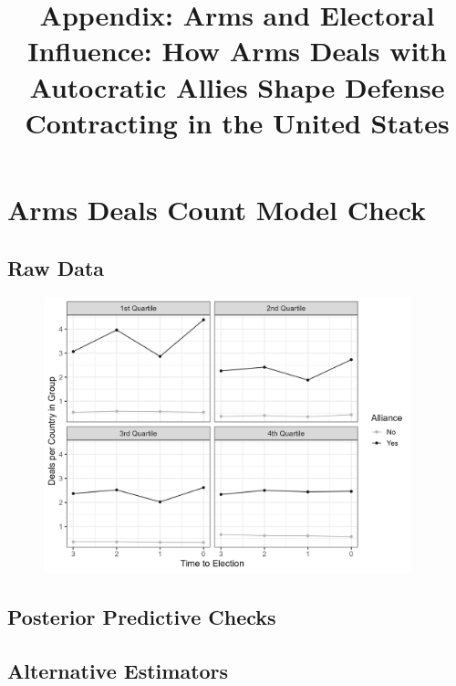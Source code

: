 \documentclass[12pt]{article}
\title{\textbf{Appendix: Arms and Electoral Influence: How Arms Deals with Autocratic Allies Shape Defense Contracting in the United States}}
\date{}
\begin{document}
\maketitle 

\singlespace 

\tableofcontents

\bigskip





\section{Arms Deals Count Model Check}

\subsection{Raw Data}

\begin{figure}[htpb]
	\centering
		\includegraphics[width=0.95\textwidth]{deals-democ-raw.png}
	\caption{}
	\label{fig:deals-pred-ols}
\end{figure}



\subsection{Posterior Predictive Checks}




\subsection{Alternative Estimators}
\end{document}
